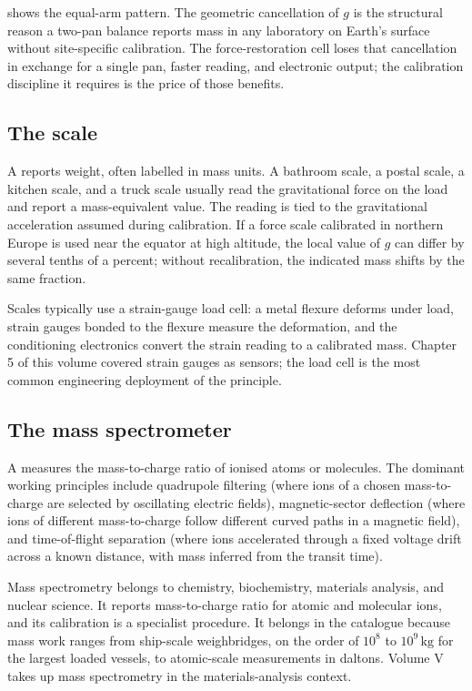 

 shows the equal-arm pattern.
The geometric cancellation of $g$ is the structural reason a
two-pan balance reports mass in any laboratory on Earth's surface
without site-specific calibration. The force-restoration cell loses
that cancellation in exchange for a single pan, faster reading, and
electronic output; the calibration discipline it requires is the
price of those benefits.

\subsection{The scale}

A  reports weight, often labelled in mass units. A
bathroom scale, a postal scale, a kitchen scale, and a truck scale
usually read the gravitational force on the load and report a
mass-equivalent value. The reading is tied to the gravitational
acceleration assumed during calibration. If a force scale
calibrated in northern Europe is used near the equator at high
altitude, the local value of $g$ can differ by several tenths of a
percent; without recalibration, the indicated mass shifts by the
same fraction.

Scales typically use a strain-gauge load cell: a metal flexure
deforms under load, strain gauges bonded to the flexure measure the
deformation, and the conditioning electronics convert the strain
reading to a calibrated mass. Chapter 5 of this volume covered strain
gauges as sensors; the load cell is the most common engineering
deployment of the principle.

\subsection{The mass spectrometer}

A  measures the mass-to-charge ratio of
ionised atoms or molecules. The dominant working principles include
quadrupole filtering (where ions of a chosen mass-to-charge are
selected by oscillating electric fields), magnetic-sector deflection
(where ions of different mass-to-charge follow different curved paths
in a magnetic field), and time-of-flight separation (where ions
accelerated through a fixed voltage drift across a known distance,
with mass inferred from the transit time).

Mass spectrometry belongs to chemistry, biochemistry, materials
analysis, and nuclear science. It reports mass-to-charge ratio for
atomic and molecular ions, and its calibration is a specialist
procedure. It belongs in the catalogue because mass work ranges from
ship-scale weighbridges, on the order of $10^{8}$ to $10^{9} \,\si
{\kilogram}$ for the largest loaded vessels, to atomic-scale
measurements in daltons. Volume V takes up mass spectrometry in the
materials-analysis context.

